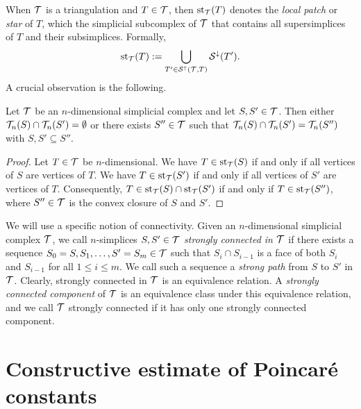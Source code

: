 \documentclass[a4paper]{article}
\begin{document}
When ${\mathcal T}$ is a triangulation and $T \in {\mathcal T}$, then $\operatorname{st}_{{\mathcal T}}(T)$ denotes the \emph{local patch} or \textit{star} of $T$, 
which the simplicial subcomplex of ${\mathcal T}$ that contains all supersimplices of $T$ and their subsimplices. Formally,
\begin{gather*}
    \operatorname{st}_{{\mathcal T}}(T) := \bigcup_{ T' \in {\mathcal S}^{\uparrow}({\mathcal T},T) } {\mathcal S}^{\downarrow}(T').
\end{gather*}
A crucial observation is the following.

\begin{lemma}
 Let ${\mathcal T}$ be an $n$-dimensional simplicial complex and let $S,S' \in {\mathcal T}$.
 Then either ${\mathcal T}_{n}(S) \cap {\mathcal T}_{n}(S') = \emptyset$ or there exists $S'' \in {\mathcal T}$
 such that ${\mathcal T}_{n}(S) \cap {\mathcal T}_{n}(S') = {\mathcal T}_{n}(S'')$ with $S, S' \subseteq S''$.
\end{lemma}
\begin{proof}
 Let $T \in {\mathcal T}$ be $n$-dimensional.
 We have $T \in \operatorname{st}_{{\mathcal T}}(S )$ if and only if all vertices of $S $ are vertices of $T$.
 We have $T \in \operatorname{st}_{{\mathcal T}}(S')$ if and only if all vertices of $S'$ are vertices of $T$.
 Consequently, $T \in \operatorname{st}_{{\mathcal T}}(S) \cap \operatorname{st}_{{\mathcal T}}(S')$ if and only if $T \in \operatorname{st}_{{\mathcal T}}(S'')$,
 where $S'' \in {\mathcal T}$ is the convex closure of $S$ and $S'$.
\end{proof}

We will use a specific notion of connectivity. 
Given an $n$-dimensional simplicial complex ${\mathcal T}$, 
we call $n$-simplices $S,S' \in {\mathcal T}$ \emph{strongly connected in ${\mathcal T}$} if there exists a sequence $S_0=S,S_1,\dots,S'=S_m \in {\mathcal T}$ such that $S_{i} \cap S_{i-1}$ is a face of both $S_{i}$ and $S_{i-1}$ for all $1 \leq i \leq m$. 
We call such a sequence a \emph{strong path} from $S$ to $S'$ in ${\mathcal T}$. 
Clearly, strongly connected in ${\mathcal T}$ is an equivalence relation. A \emph{strongly connected component} of ${\mathcal T}$ is an equivalence class under this equivalence relation, 
and we call ${\mathcal T}$ strongly connected if it has only one strongly connected component. 










\section{Constructive estimate of Poincar\'e constants}\label{section:poincare}
\end{document}
